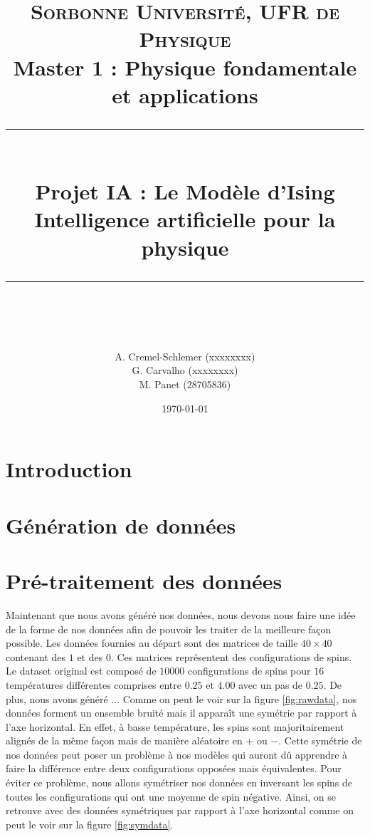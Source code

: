 \documentclass[11pt]{scrartcl} %
\title{	
	\normalfont\normalsize
	\large\textsc{Sorbonne Université, UFR de Physique}\\ %
	\vspace{2pt} %
	\normalsize Master 1 : Physique fondamentale et applications\\
	\vspace{25pt} %
	\rule{\linewidth}{0.5pt}\\ %
	\vspace{20pt} %
	{\huge Projet IA : Le Modèle d'Ising}\\ %
	\vspace{2pt} %
	{Intelligence artificielle pour la physique}\\
	\vspace{12pt} %
	\rule{\linewidth}{2pt}\\ %
	\vspace{12pt} %
}
\author{\LARGE A. Cremel-Schlemer \large (xxxxxxxx) \\ \LARGE G. Carvalho \large (xxxxxxxx) \\ \LARGE M. Panet \large (28705836)} %
\date{\normalsize\today} %
\begin{document}
\maketitle %
\tableofcontents %

\section*{Introduction}

\section{Génération de données}

\section{Pré-traitement des données}
Maintenant que nous avons généré nos données, nous devons nous faire une idée de la forme de nos données afin de pouvoir les traiter de la meilleure façon possible.
Les données fournies au départ sont des matrices de taille $40 \times 40$ contenant des $1$ et des $0$. Ces matrices représentent des configurations de spins. Le dataset original est composé de $10000$ configurations de spins pour $16$ températures différentes comprises entre $0.25$ et $4.00$ avec un pas de $0.25$. 
De plus, nous avons généré ...
Comme on peut le voir sur la figure \ref{fig:rawdata}, nos données forment un ensemble bruité mais il apparaît une symétrie par rapport à l'axe horizontal. En effet, à basse température, les spins sont majoritairement alignés de la même façon mais de manière aléatoire en $+$ ou $-$.
Cette symétrie de nos données peut poser un problème à nos modèles qui auront dû apprendre à faire la différence entre deux configurations opposées mais équivalentes. Pour éviter ce problème, nous allons symétriser nos données en inversant les spins de toutes les configurations qui ont une moyenne de spin  négative. 
Ainsi, on se retrouve avec des données symétriques par rapport à l'axe horizontal comme on peut le voir sur la figure \ref{fig:symdata}.
\end{document}
